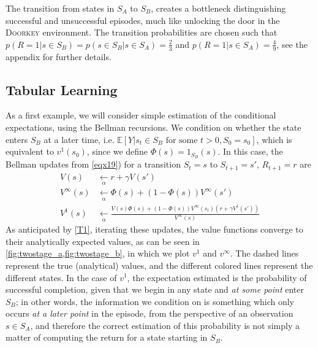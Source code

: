 \documentclass[letterpaper]{article} %
\newcommand{\EE}{\mathbb{E}}
\newcommand{\doorkey}{\textsc{Doorkey}\xspace}
\begin{document}
	The transition from states in $S_A$ to $S_B$, creates a bottleneck distinguishing successful and unsuccessful episodes, much like unlocking the door in the \doorkey environment. The transition probabilities are chosen such that $p(R=1| s \in S_B) = p(s \in S_B | s \in S_A)  = \frac{2}{3}$ and $p(R=1 | s \in S_A) = \frac{4}{9}$, see the appendix for further details. 
	
	
	
	
	
	
	\subsection{Tabular Learning} \label{sec32}%
	As a first example, we will consider simple estimation of the conditional expectations, using the Bellman recursions. We condition on whether the state enters $S_B$ at a later time, i.e. $\EE[Y| \mbox{$s_t \in S_B$ for some $t > 0$}, S_0 = s_0]$, which is equivalent to $v^1(s_0)$, since we define $\Phi(s) = 1_{S_B}(s)$. In this case, the Bellman updates from \cref{eqx19}) for a transition $S_t = s$ to $S_{t+1}=s'$, $R_{t+1} = r$ are
	\begin{align}
		V(s) & \underset{\alpha }{\leftarrow } r + \gamma V(s') \nonumber  \\%
		V^\infty(s) & \underset{\alpha}{\leftarrow } \Phi(s)  + (1-\Phi(s) ) V^\infty(s') \label{eq35b} \\ 
		\!\!V^{1}(s) & \underset{\alpha}{\leftarrow }  
		\frac{ 
			V(s) \Phi(s)\! +\! (1\! -\! \Phi(s) )V^\infty(s_{t} ) \left(  r\! +\!  \gamma V^{1}(s' )  \right) }{ V^\infty(s) } \nonumber %
	\end{align}
	As anticipated by \cref{T1}, iterating these updates, the value functions converge to their analytically expected values, as can be seen in \cref{fig:twostage_a,fig:twostage_b}, in which we plot $v^1$ and $v^\infty$. The dashed lines represent the true (analytical) values, and the different colored lines represent the different states. 
	In the case of $v^1$, the expectation estimated is the probability of successful completion, given that we begin in any state and \emph{at some point} enter $S_B$; in other words, the information we condition on is something which only occurs \emph{at a later point} in the episode, from the perspective of an observation $s\in S_A$, and therefore the correct estimation of this probability is not simply a matter of computing the return for a state starting in $S_B$. %
	
\end{document}
